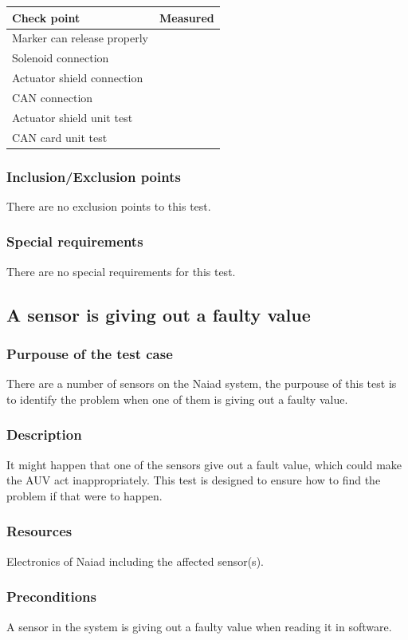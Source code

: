\documentclass[10pt,a4paper]{article}
\begin{document}
\begin{tabular}{| l | c |}
\hline
Check point & Measured \\ \hline
Marker can release properly &  \\ \hline
Solenoid connection &  \\ \hline
Actuator shield connection &  \\ \hline
CAN connection & \\ \hline
Actuator shield unit test & \\ \hline
CAN card unit test & \\ \hline
\end{tabular} 
\subsubsection*{Inclusion/Exclusion points}
There are no exclusion points to this test. 
\subsubsection*{Special requirements}
There are no special requirements for this test. 

\subsection{A sensor is giving out a faulty value}
\subsubsection*{Purpouse of the test case}
There are a number of sensors on the Naiad system, the purpouse of this test is to identify the problem when one of them is giving out a faulty value. 
\subsubsection*{Description}
It might happen that one of the sensors give out a fault value, which could make the AUV act inappropriately. This test is designed to ensure how to find the problem if that were to happen. 
\subsubsection*{Resources}
Electronics of Naiad including the affected sensor(s).
\subsubsection*{Preconditions}
A sensor in the system is giving out a faulty value when reading it in software. 
\end{document}

